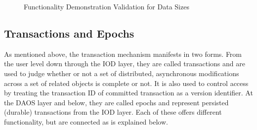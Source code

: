 \documentclass{sig-alt-gov2}
\begin{document}
\begin{figure}[htbp!]
\centering
\vspace{-0.10in}
\vspace{-0.10in}
\caption{Functionality Demonstration Validation for Data Sizes}
\label{fig:eval-size}
\vspace{-0.2in}
\end{figure}

\subsection{Transactions and Epochs}
\label{sec:transactions}

As mentioned above, the transaction mechanism manifests in two forms. From the
user level down through the IOD layer, they are called transactions and are
used to judge whether or not a set of distributed, asynchronous modifications
across a set of related objects is complete or not.  It is also used to control
access by treating the transaction ID of committed transaction as a version
identifier.  At the DAOS layer and below, they are called epochs and represent
persisted (durable) transactions from the IOD layer. Each of these offers
different functionality, but are connected as is explained below.
\end{document}
